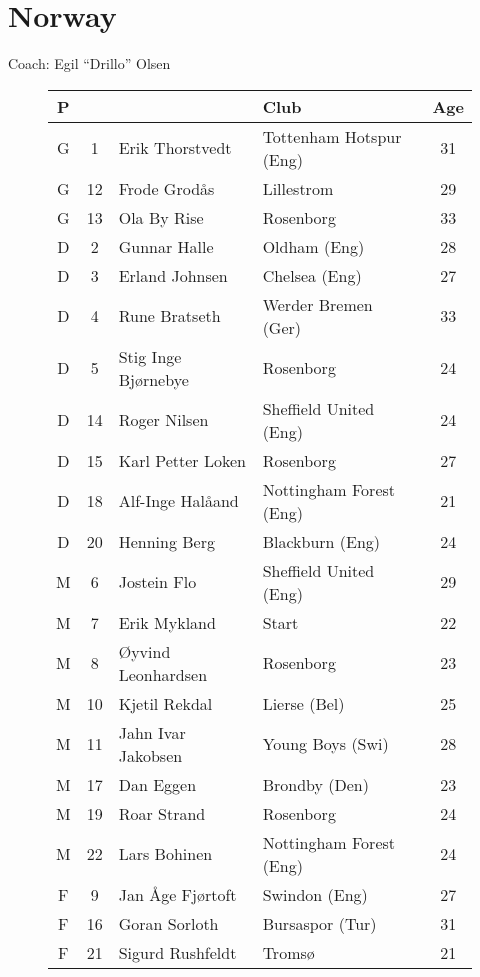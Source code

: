 \chapter{Norway}
\newline
\newline
Coach: Egil ``Drillo'' Olsen
\begin{figure}[H]
\begin{tabular}{c c l l c}
P & & & Club & Age \\ \hline
G & 1 & Erik Thorstvedt & Tottenham Hotspur (Eng) & 31 \\
G & 12 & Frode Grod{\aa}s & Lillestrom & 29 \\
G & 13 & Ola By Rise & Rosenborg & 33 \\ \hline
D & 2 & Gunnar Halle & Oldham (Eng) & 28 \\
D & 3 & Erland Johnsen & Chelsea (Eng) & 27 \\
D & 4 & Rune Bratseth & Werder Bremen (Ger) & 33 \\
D & 5 & Stig Inge Bj{\o}rnebye & Rosenborg & 24 \\
D & 14 & Roger Nilsen & Sheffield United (Eng) & 24 \\
D & 15 & Karl Petter Loken & Rosenborg & 27 \\
D & 18 & Alf-Inge Hal{\aa}and & Nottingham Forest (Eng) & 21 \\
D & 20 & Henning Berg & Blackburn (Eng) & 24 \\ \hline
M & 6 & Jostein Flo & Sheffield United (Eng) & 29 \\
M & 7 & Erik Mykland & Start & 22 \\
M & 8 & {\O}yvind Leonhardsen & Rosenborg & 23 \\
M & 10 & Kjetil Rekdal & Lierse (Bel) &  25  \\
M & 11 & Jahn Ivar Jakobsen & Young Boys (Swi) & 28 \\
M & 17 & Dan Eggen & Brondby (Den) & 23 \\
M & 19 & Roar Strand & Rosenborg &  24 \\
M & 22 & Lars Bohinen & Nottingham Forest (Eng) & 24 \\ \hline
F & 9 & Jan {\AA}ge Fj{\o}rtoft & Swindon (Eng) & 27 \\
F & 16 & Goran Sorloth & Bursaspor (Tur) & 31 \\
F & 21 & Sigurd Rushfeldt & Troms{\o} & 21 \\ \hline
\end{tabular}
\end{figure}
